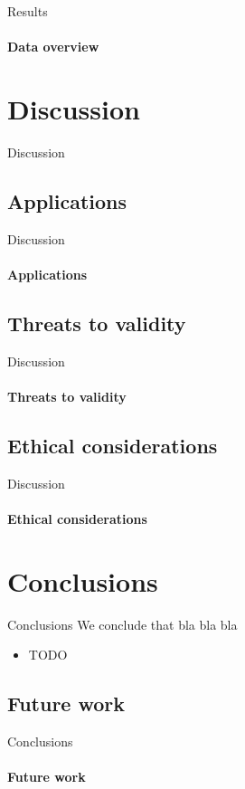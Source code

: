 \documentclass[xcolor={dvipsnames,table}]{beamer}
\newif\ifplacelogo{}  %
\begin{document}
\placelogofalse{}
\begin{frame}{Results}
    \framesubtitle{Data overview}
    {
        \tiny
        
    }
\end{frame}
\placelogotrue{}

\section{Discussion}
\begin{frame}{Discussion}
\end{frame}

\subsection{Applications}
\begin{frame}{Discussion}
    \framesubtitle{Applications}
\end{frame}

\subsection{Threats to validity}
\begin{frame}{Discussion}
    \framesubtitle{Threats to validity}
\end{frame}

\subsection{Ethical considerations}
\begin{frame}{Discussion}
    \framesubtitle{Ethical considerations}
\end{frame}

\section{Conclusions}
\begin{frame}{Conclusions}
    We conclude that bla bla bla

    \begin{itemize}
        \item TODO
    \end{itemize}
\end{frame}

\subsection{Future work}
\begin{frame}{Conclusions}
    \framesubtitle{Future work}
\end{frame}
\end{document}
